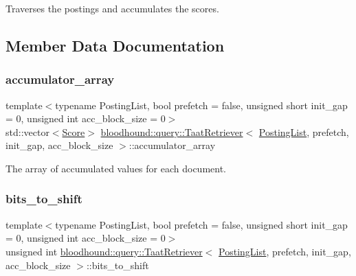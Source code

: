 Traverses the postings and accumulates the scores. 



\subsection{Member Data Documentation}
\mbox{\label{classbloodhound_1_1query_1_1TaatRetriever_a604c7ab279ced03ccc1866d55c844b11}} 
\subsubsection{\texorpdfstring{accumulator\+\_\+array}{accumulator\_array}}
{\footnotesize\ttfamily template$<$typename Posting\+List, bool prefetch = false, unsigned short init\+\_\+gap = 0, unsigned int acc\+\_\+block\+\_\+size = 0$>$ \\
std\+::vector$<$\hyperlink{structbloodhound_1_1Score}{Score}$>$ \hyperlink{classbloodhound_1_1query_1_1TaatRetriever}{bloodhound\+::query\+::\+Taat\+Retriever}$<$ \hyperlink{classbloodhound_1_1PostingList}{Posting\+List}, prefetch, init\+\_\+gap, acc\+\_\+block\+\_\+size $>$\+::accumulator\+\_\+array\hspace{0.3cm}{\ttfamily [protected]}}



The array of accumulated values for each document. 

\mbox{\label{classbloodhound_1_1query_1_1TaatRetriever_aa2b4875de4f02a856e64560bf002296f}} 
\subsubsection{\texorpdfstring{bits\+\_\+to\+\_\+shift}{bits\_to\_shift}}
{\footnotesize\ttfamily template$<$typename Posting\+List, bool prefetch = false, unsigned short init\+\_\+gap = 0, unsigned int acc\+\_\+block\+\_\+size = 0$>$ \\
unsigned int \hyperlink{classbloodhound_1_1query_1_1TaatRetriever}{bloodhound\+::query\+::\+Taat\+Retriever}$<$ \hyperlink{classbloodhound_1_1PostingList}{Posting\+List}, prefetch, init\+\_\+gap, acc\+\_\+block\+\_\+size $>$\+::bits\+\_\+to\+\_\+shift\hspace{0.3cm}{\ttfamily [protected]}}

